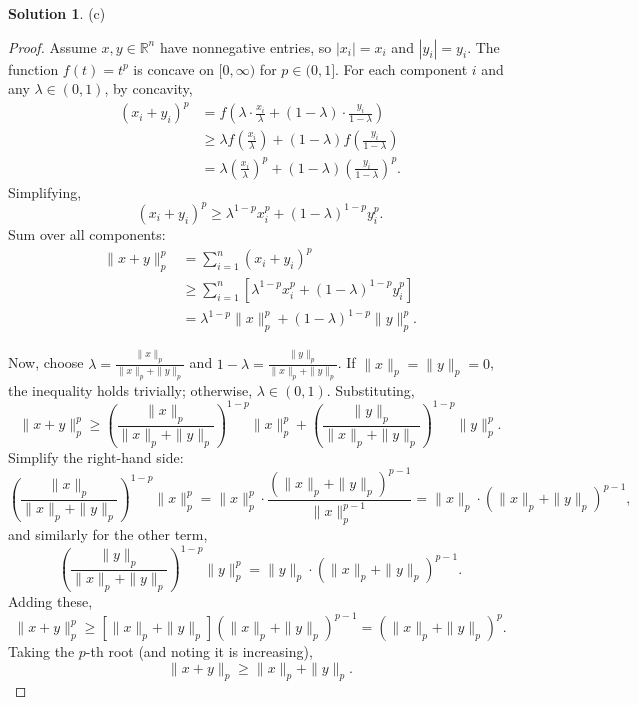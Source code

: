 \documentclass[12pt]{article}
\theoremstyle{definition}
\newtheorem*{solution}{\normalfont\textbf{Solution}}
\begin{document}
\begin{enumerate}[leftmargin=*]
\begin{solution}
        \item[(c)] 
           \begin{proof}
                Assume \( x, y \in \mathbb{R}^n \) have nonnegative entries, so \( |x_i| = x_i \) and \( |y_i| = y_i \). The function \( f(t) = t^p \) is concave on \( [0, \infty) \) for \( p \in (0,1] \). For each component \( i \) and any \( \lambda \in (0,1) \), by concavity,
                \begin{align*}
                (x_i + y_i)^p &= f\left( \lambda \cdot \frac{x_i}{\lambda} + (1 - \lambda) \cdot \frac{y_i}{1 - \lambda} \right) \\
                &\geq \lambda f\left( \frac{x_i}{\lambda} \right) + (1 - \lambda) f\left( \frac{y_i}{1 - \lambda} \right) \\
                &= \lambda \left( \frac{x_i}{\lambda} \right)^p + (1 - \lambda) \left( \frac{y_i}{1 - \lambda} \right)^p.
                \end{align*}
                Simplifying,
                \[
                (x_i + y_i)^p \geq \lambda^{1 - p} x_i^p + (1 - \lambda)^{1 - p} y_i^p.
                \]
                Sum over all components:
                \begin{align*}
                    \|x + y\|_p^p &= \sum_{i=1}^n (x_i + y_i)^p \\
                    &\geq \sum_{i=1}^n \left[ \lambda^{1 - p} x_i^p + (1 - \lambda)^{1 - p} y_i^p \right] \\
                    &= \lambda^{1 - p} \|x\|_p^p + (1 - \lambda)^{1 - p} \|y\|_p^p.
                \end{align*}

                Now, choose \( \lambda = \frac{\|x\|_p}{\|x\|_p + \|y\|_p} \) and \( 1 - \lambda = \frac{\|y\|_p}{\|x\|_p + \|y\|_p} \). If \( \|x\|_p = \|y\|_p = 0 \), the inequality holds trivially; otherwise, \( \lambda \in (0,1) \). Substituting,
                \[
                \|x + y\|_p^p \geq \left( \frac{\|x\|_p}{\|x\|_p + \|y\|_p} \right)^{1 - p} \|x\|_p^p + \left( \frac{\|y\|_p}{\|x\|_p + \|y\|_p} \right)^{1 - p} \|y\|_p^p.
                \]
                Simplify the right-hand side:
                \[
                \left( \frac{\|x\|_p}{\|x\|_p + \|y\|_p} \right)^{1 - p} \|x\|_p^p = \|x\|_p^p \cdot \frac{ (\|x\|_p + \|y\|_p)^{p-1} }{ \|x\|_p^{p-1} } = \|x\|_p \cdot (\|x\|_p + \|y\|_p)^{p-1},
                \]
                and similarly for the other term,
                \[
                \left( \frac{\|y\|_p}{\|x\|_p + \|y\|_p} \right)^{1 - p} \|y\|_p^p = \|y\|_p \cdot (\|x\|_p + \|y\|_p)^{p-1}.
                \]
                Adding these,
                \[
                \|x + y\|_p^p \geq \left[ \|x\|_p + \|y\|_p \right] (\|x\|_p + \|y\|_p)^{p-1} = (\|x\|_p + \|y\|_p)^p.
                \]
                Taking the \( p \)-th root (and noting it is increasing),
                \[
                \|x + y\|_p \geq \|x\|_p + \|y\|_p.
                \]
            \end{proof}


\end{solution}
\end{enumerate}
\end{document}
